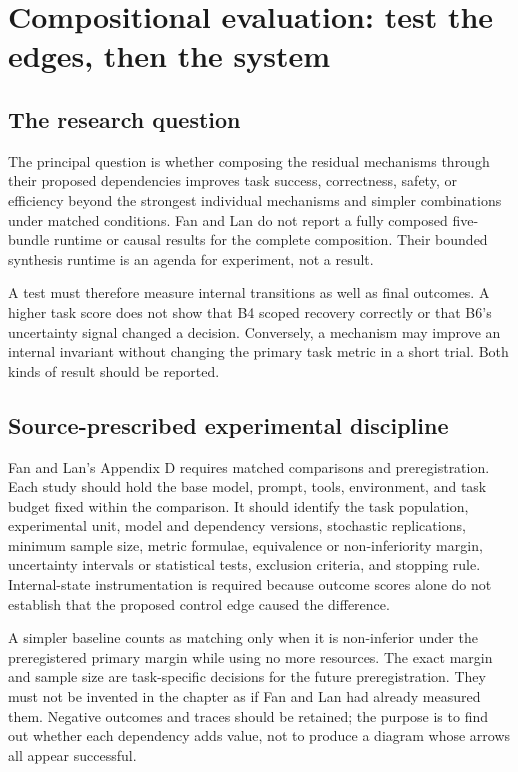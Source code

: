 \section{Compositional evaluation: test the edges, then the system}
\label{sec:ch18-compositional-evaluation}

\subsection{The research question}
\label{subsec:ch18-evaluation-question}

The principal question is whether composing the residual mechanisms through their proposed dependencies improves task success, correctness, safety, or efficiency beyond the strongest individual mechanisms and simpler combinations under matched conditions. Fan and Lan do not report a fully composed five-bundle runtime or causal results for the complete composition. Their bounded synthesis runtime is an agenda for experiment, not a result.

A test must therefore measure internal transitions as well as final outcomes. A higher task score does not show that B4 scoped recovery correctly or that B6's uncertainty signal changed a decision. Conversely, a mechanism may improve an internal invariant without changing the primary task metric in a short trial. Both kinds of result should be reported.

\subsection{Source-prescribed experimental discipline}
\label{subsec:ch18-preregistration}

Fan and Lan's Appendix D requires matched comparisons and preregistration. Each study should hold the base model, prompt, tools, environment, and task budget fixed within the comparison. It should identify the task population, experimental unit, model and dependency versions, stochastic replications, minimum sample size, metric formulae, equivalence or non-inferiority margin, uncertainty intervals or statistical tests, exclusion criteria, and stopping rule. Internal-state instrumentation is required because outcome scores alone do not establish that the proposed control edge caused the difference.

A simpler baseline counts as matching only when it is non-inferior under the preregistered primary margin while using no more resources. The exact margin and sample size are task-specific decisions for the future preregistration. They must not be invented in the chapter as if Fan and Lan had already measured them. Negative outcomes and traces should be retained; the purpose is to find out whether each dependency adds value, not to produce a diagram whose arrows all appear successful.

